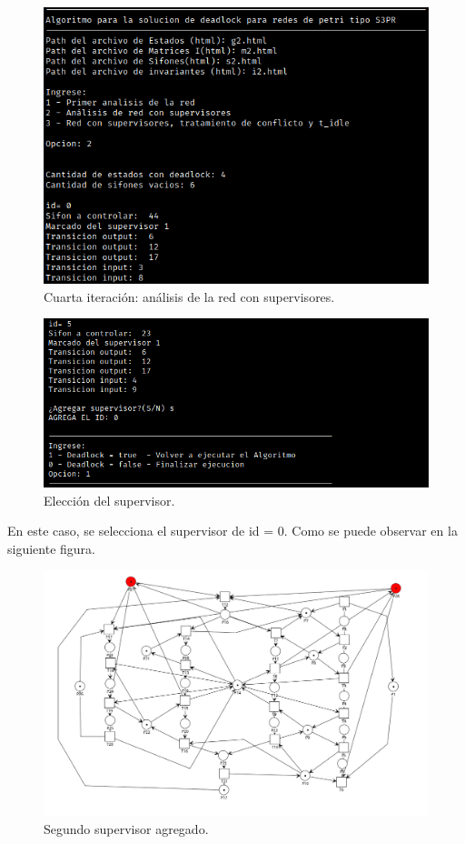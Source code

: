 \begin{figure} [H]
    \centering
    \includegraphics[width=\textwidth]{Figures/apendiceB/Py-POPN6.png}
    \caption{Cuarta iteración: análisis de la red con supervisores.}
    \label{fig:b-popn6}
\end{figure}

\begin{figure} [H]
    \centering
    \includegraphics[width=\textwidth]{Figures/apendiceB/Py-POPN7.png}
    \caption{Elección del supervisor.}
    \label{fig:b-popn7}
\end{figure}

En este caso, se selecciona el supervisor de id = 0. Como se puede observar en la siguiente figura.

\begin{figure} [H]
    \centering
    \includegraphics[width=\textwidth]{Figures/apendiceB/supervisor2.png}
    \caption{Segundo supervisor agregado.}
    \label{fig:b-supervisor2}
\end{figure}

